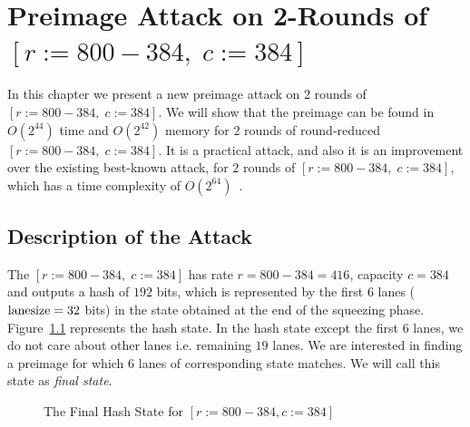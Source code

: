 \chapter{Preimage Attack on 2-Rounds of \KECCAK{}${[r:=800-384,\; c:=384]}$}

In this chapter we present a new preimage attack on $2$ rounds of \KECCAK{}$[r:=800-384,\;c:=384]$. We will show that the preimage can be found in $O(2^{44})$ time and $O(2^{42})$ memory for $2$ rounds of round-reduced \KECCAK{}$[r:=800-384,\;c:=384]$. It is a practical attack, and also it is an improvement over the existing best-known attack, for $2$ rounds of \KECCAK{}$[r:=800-384,\;c:=384]$, which has a time complexity of $O(2^{64})$~\cite{guo2016linear}.

\section{Description of the Attack}
\label{2rkeccak800attack}
The \KECCAK{}$[r:=800-384,\;c:=384]$ has rate $r = 800-384 = 416$, capacity $c = 384$ and outputs a hash of $192$ bits, which is represented by the first $6$ lanes (${\rm lanesize} = 32$ bits) in the state obtained at the end of the squeezing phase. Figure~\ref{initial_sq} represents the hash state. In the hash state except the first $6$ lanes, we do not care about other lanes i.e. remaining $19$ lanes. We are interested in finding a preimage for which $6$ lanes of corresponding state matches. We will call this state as \emph{final state}.
\begin{figure}[ht]
\begin{center}
\end{center}
\caption{The Final Hash State for \KECCAK{}$[r:=800-384, c:=384]$ \label{initial_sq}}
\end{figure}
